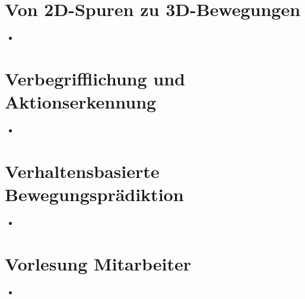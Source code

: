 \documentclass{report}
\begin{document}
	
	\section{Von 2D-Spuren zu 3D-Bewegungen}
	
	\begin{itemize}
		\item 
	\end{itemize}
	
	
	\section{Verbegrifflichung und Aktionserkennung}
	
	\begin{itemize}
		\item 
	\end{itemize}
	
	
	\section{Verhaltensbasierte Bewegungsprädiktion}
	
	\begin{itemize}
		\item 
	\end{itemize}
	
	
	\section{Vorlesung Mitarbeiter}
	
	\begin{itemize}
		\item 
	\end{itemize}
	
	
\end{document}

